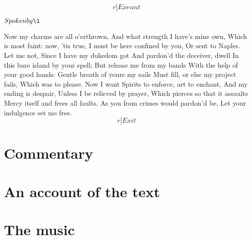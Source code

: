 \documentclass[11pt]{book}
\begin{document}
	\[r]Exeunt\]


   \Facies  {}


	\( Spoken by \1\)

   Now my charms are all o'erthrown,
	And what strength I have's mine own,
	Which is most faint: now, 'tis true,
	I must be here confined by you,
	Or sent to Naples. Let me not,
	Since I have my dukedom got
	And pardon'd the deceiver, dwell
	In this bare island by your spell;
	But release me from my bands
	With the help of your good hands:
	Gentle breath of yours my sails
	Must fill, or else my project fails,
	Which was to please. Now I want
	Spirits to enforce, art to enchant,
	And my ending is despair,
	Unless I be relieved by prayer,
	Which pierces so that it assaults
	Mercy itself and frees all faults.
	As you from crimes would pardon'd be,
	Let your indulgence set me free. \[r]Exit\]

\endVersus
\endDrama


\chapter {Commentary}

\lorem [33524] 

\chapter {An account of the text}

\lorem [23142] 

\chapter {The music}

\lorem [4312] 
\end{document}
